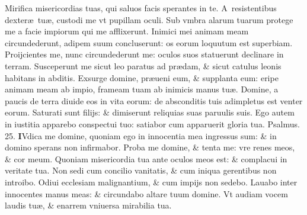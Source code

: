 \documentclass[a5paper,10pt]{book}
\def\ae{æ}
\begin{document}
\begin{multicols*}{2}
\newline \color{red} M\color{black}irifica misericordias tuas, qui saluos facis sperantes in te.
\newline \color{red} A\color{black}\ resistentibus dexter\ae \ tu\ae , custodi me vt pupillam oculi.
\newline \color{red} S\color{black}ub vmbra alarum tuarum protege me a facie impiorum qui me afflixerunt.
\newline \color{red} I\color{black}nimici mei animam meam circundederunt, adipem suum concluserunt: os eorum loquutum est superbiam.
\newline \color{red} P\color{black}roijcientes me, nunc circundederunt me: oculos suos statuerunt declinare in terram.
\newline \color{red} S\color{black}usceperunt me sicut leo paratus ad pr\ae dam, \& sicut catulus leonis habitans in abditis.
\newline \color{red} E\color{black}xsurge domine, pr\ae ueni eum, \& supplanta eum: eripe animam meam ab impio, frameam tuam ab inimicis manus tu\ae .
\newline \color{red} D\color{black}omine, a paucis de terra diuide eos in vita eorum: de absconditis tuis adimpletus est venter eorum.
\newline \color{red} S\color{black}aturati sunt filijs: \& dimiserunt reliquias suas paruulis suis.
\newline \color{red} E\color{black}go autem in iustitia apparebo conspectui tuo: satiabor cum apparuerit gloria tua. \quad \color{red} Psalmus. 25.\color{black}
\lettrine[lines=2]{\bfseries \color{red} I}{}Vdica me domine, quoniam ego in innocentia mea ingressus sum: \& in domino sperans non infirmabor.
\newline \color{red} P\color{black}roba me domine, \& tenta me: vre renes meos, \& cor meum.
\newline \color{red} Q\color{black}uoniam misericordia tua ante oculos meos est: \& complacui in veritate tua.
\newline \color{red} N\color{black}on sedi cum concilio vanitatis, \& cum iniqua gerentibus non introibo.
\newline \color{red} O\color{black}diui ecclesiam malignantium, \& cum impijs non sedebo.
\newline \color{red} L\color{black}auabo inter innocentes manus meas: \& circundabo altare tuum domine.
\newline \color{red} V\color{black}t audiam vocem laudis tu\ae , \& enarrem vniuersa mirabilia tua.%

\end{multicols*}
\end{document}
